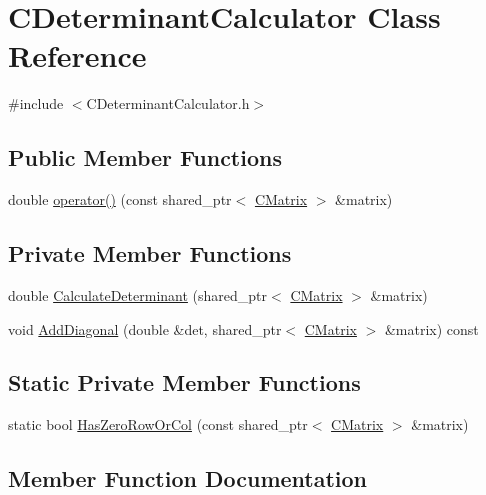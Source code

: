 \hypertarget{classCDeterminantCalculator}{}\section{C\+Determinant\+Calculator Class Reference}
\label{classCDeterminantCalculator}


{\ttfamily \#include $<$C\+Determinant\+Calculator.\+h$>$}

\subsection*{Public Member Functions}
\begin{DoxyCompactItemize}
\item 
double \hyperlink{classCDeterminantCalculator_a1f86ba4955b9cabf3042b96be7563a10}{operator()} (const shared\+\_\+ptr$<$ \hyperlink{classCMatrix}{C\+Matrix} $>$ \&matrix)
\end{DoxyCompactItemize}
\subsection*{Private Member Functions}
\begin{DoxyCompactItemize}
\item 
double \hyperlink{classCDeterminantCalculator_a1b56e8907eb6d7bbc9083d7f10118186}{Calculate\+Determinant} (shared\+\_\+ptr$<$ \hyperlink{classCMatrix}{C\+Matrix} $>$ \&matrix)
\item 
void \hyperlink{classCDeterminantCalculator_a9da30150339c152a64e7e43b10d98d08}{Add\+Diagonal} (double \&det, shared\+\_\+ptr$<$ \hyperlink{classCMatrix}{C\+Matrix} $>$ \&matrix) const 
\end{DoxyCompactItemize}
\subsection*{Static Private Member Functions}
\begin{DoxyCompactItemize}
\item 
static bool \hyperlink{classCDeterminantCalculator_a3cda3c851df4a12fa39cef7b5fe08261}{Has\+Zero\+Row\+Or\+Col} (const shared\+\_\+ptr$<$ \hyperlink{classCMatrix}{C\+Matrix} $>$ \&matrix)
\end{DoxyCompactItemize}


\subsection{Member Function Documentation}
